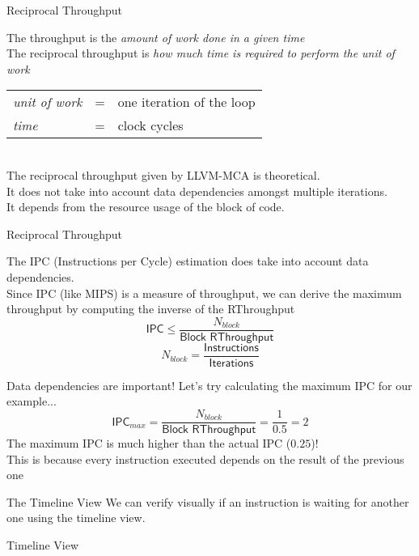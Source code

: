 \begin{frame}{Reciprocal Throughput}
\begin{center}
The \alert{throughput} is the \emph{amount of work done in a given time}\\
\medskip
The \alert{reciprocal throughput} is \emph{how much time is required to perform the unit of work}\\
%
\bigskip
\begin{tabular}{>{\raggedleft}p{} c p{}}
\emph{unit of work} & = & one iteration of the loop\\
\emph{time} & = & clock cycles \\
\end{tabular}\\
\bigskip
%
The reciprocal throughput given by LLVM-MCA is \alert{theoretical}.\\
It does not take into account data dependencies amongst multiple iterations.\\
\medskip
It depends from the resource usage of the block of code.
\end{center}
\end{frame}


\begin{frame}{Reciprocal Throughput}
\begin{center}
The IPC (Instructions per Cycle) estimation \alert{does} take into account data dependencies.\\
\bigskip
Since IPC (like MIPS) is a measure of \alert{throughput}, we can derive the \alert{maximum throughput} by computing the \alert{inverse of the RThroughput}\\
\bigskip
\[
\textsf{IPC} \le \frac{N_{block}}{\textsf{Block RThroughput}}
\]
\[
N_{block} = \frac{\textsf{Instructions}}{\textsf{Iterations}}
\]
\end{center}
\end{frame}


\begin{frame}{Data dependencies are important!}
Let's try calculating the maximum IPC for our example...
\[
\textsf{IPC}_{max} = \frac{N_{block}}{\textsf{Block RThroughput}} = \frac{1}{0.5} = 2
\]
The maximum IPC is much higher than the \alert{actual} IPC ($0.25$)!\\
\medskip
This is because \alert{every instruction executed depends on the result of the previous one}
\end{frame}


\begin{frame}{The Timeline View}
We can verify visually if an instruction is waiting for another one using the \alert{timeline view}.
\bigskip
\begin{block}{Timeline View}
\txtinput[\tt\fontsize{6.7pt}{8pt}\selectfont]{listings/01_add_reduction_v1_p02.txt}
\end{block}
\end{frame}



